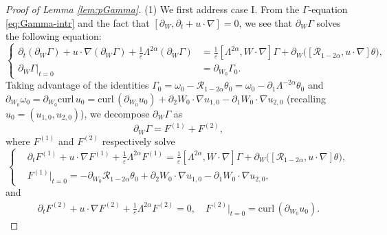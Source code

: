 \documentclass[reqno,11pt,a4paper]{amsart}
\begin{document}
\begin{proof}[Proof of Lemma \ref{lem:pGamma}]
(1) We first address case I.
From the $\Gamma$-equation \eqref{eq:Gamma-intr} and the fact that $\left[\partial_W, \partial_t+u \cdot \nabla\right]=0$,
we see that $\partial_W \Gamma$ solves the following equation:
\begin{equation}\label{eq:parW}
\left\{
\begin{aligned}
  \partial_t\left(\partial_W \Gamma\right)+u \cdot \nabla\left(\partial_W \Gamma\right)
  + \frac{1}{\varepsilon} \Lambda^{2\alpha}\left(\partial_W \Gamma\right)
  & = \frac{1}{\varepsilon} [\Lambda^{2\alpha},W\cdot\nabla]\Gamma
  + \partial_W \big(\left[\mathcal{R}_{1-2\alpha}, u \cdot \nabla\right] \theta\big), \\
  \partial_W \Gamma |_{t=0} & = \partial_{W_0}\Gamma_0.
\end{aligned}
\right.
\end{equation}
Taking advantage of the identities 
$\Gamma_0=\omega_0-\mathcal{R}_{1-2\alpha} \theta_0  =\omega_0-\partial_1 \Lambda^{-2\alpha} \theta_0$
and $\partial_{W_0}\omega_0=\partial_{W_0}\mathrm{curl}\,u_0=\mathrm{curl}\, (\partial_{W_0}u_0)
+\partial_2W_0\cdot\nabla u_{1,0}-\partial_1W_0\cdot\nabla u_{2,0}$ (recalling $u_0= (u_{1,0},u_{2,0})$),
we decompose $\partial_W\Gamma$ as
\begin{equation*}
 \partial_W\Gamma = F^{(1)} + F^{(2)},
\end{equation*}
where $F^{(1)}$ and $F^{(2)}$ respectively solve 
\begin{equation}\label{eq:F1}
\left\{
\begin{aligned}
  & \partial_t F^{(1)} + u\cdot\nabla F^{(1)} + \frac{1}{\varepsilon} \Lambda^{2\alpha} F^{(1)}
  = \frac{1}{\varepsilon} [\Lambda^{2\alpha},W\cdot\nabla]\Gamma
  + \partial_W \big(\left[\mathcal{R}_{1-2\alpha}, u \cdot \nabla\right] \theta\big), \\
  & F^{(1)}\big|_{t=0} = -\partial_{W_0} \mathcal{R}_{1-2\alpha} \theta_0 + \partial_2W_0\cdot\nabla u_{1,0} 
  - \partial_1W_0\cdot\nabla u_{2,0},
\end{aligned}
\right.
\end{equation}
and
\begin{equation}\label{eq:F2}
\begin{aligned}
  \partial_t F^{(2)} + u\cdot\nabla F^{(2)} + \frac{1}{\varepsilon} \Lambda^{2\alpha} F^{(2)} = 0, 
  \quad F^{(2)}\big|_{t=0} = \mathrm{curl} \,(\partial_{W_0}u_0) .
\end{aligned}
\end{equation}



\end{proof}
\end{document}
